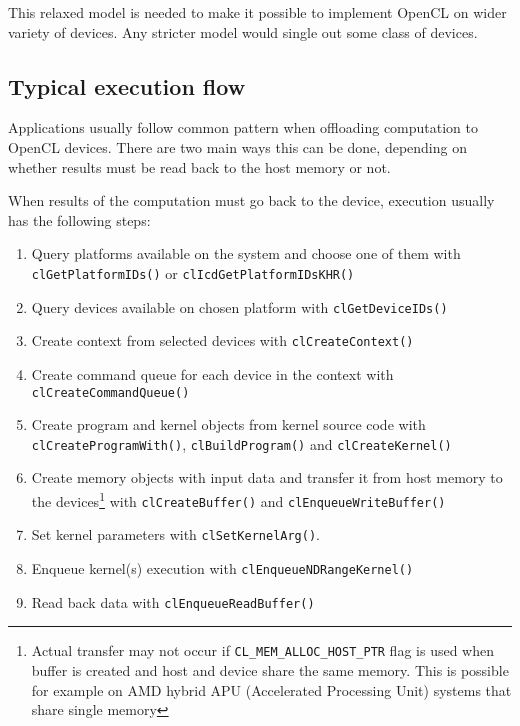 This relaxed model is needed to make it possible to implement OpenCL on wider
variety of devices. Any stricter model would single out some class of devices.

\subsection{Typical execution flow}
Applications usually follow common pattern when offloading computation to OpenCL
devices. There are two main ways this can be done, depending on whether results
must be read back to the host memory or not.

When results of the computation must go back to the device, execution usually
has the following steps:

\begin{enumerate}
  \item Query platforms available on the system and choose one of them with
    \texttt{clGetPlatformIDs()} or \texttt{clIcd\-Get\-Platform\-IDsKHR()}
  \item Query devices available on chosen platform with \texttt{clGet\-DeviceIDs()}
  \item Create context from selected devices with \texttt{clCreate\-Context()}
  \item Create command queue for each device in the context with
    \texttt{clCreate\-Command\-Queue()}
  \item Create program and kernel objects from kernel source code with
    \texttt{clCreate\-Program\-With()}, \texttt{clBuild\-Program()} and
    \texttt{clCreate\-Kernel()}
  \item Create memory objects with input data and transfer it from host memory
    to the devices\footnote{Actual transfer may not occur if
      \texttt{CL\_MEM\_ALLOC\_HOST\_PTR} flag is used when buffer is created and
      host and device share the same memory. This is possible for example on
    AMD hybrid APU (Accelerated Processing Unit) systems that share single
    memory} with
    \texttt{clCreate\-Buffer()} and \texttt{clEnqueue\-Write\-Buffer()}
  \item Set kernel parameters with \texttt{clSet\-KernelArg()}.
  \item Enqueue kernel(s) execution with \texttt{clEnqueue\-NDRange\-Kernel()}
  \item Read back data with \texttt{clEnqueue\-Read\-Buffer()}
\end{enumerate}

